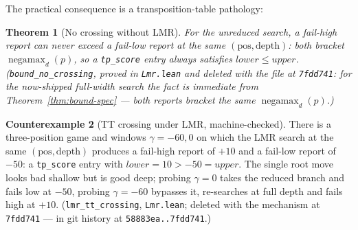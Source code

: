 \documentclass[11pt]{article}
\DeclareMathOperator{\negamax}{negamax}
\theoremstyle{plain}
\newtheorem{theorem}{Theorem}[section]
\theoremstyle{definition}
\newtheorem{counterexample}[theorem]{Counterexample}
\theoremstyle{remark}
\begin{document}
The practical consequence is a transposition-table pathology:

\begin{theorem}[No crossing without LMR]
\label{thm:no-crossing}
For the unreduced search, a fail-high report can never exceed a fail-low
report at the same $(\mathrm{pos}, \mathrm{depth})$: both bracket
$\negamax_d(p)$, so a \texttt{tp\_score} entry always satisfies
$\mathit{lower} \le \mathit{upper}$.
(\texttt{bound\_no\_crossing}, proved in \texttt{Lmr.lean} and deleted
with the file at \texttt{7fdd741}: for the now-shipped full-width
search the fact is immediate from Theorem~\ref{thm:bound-spec} ---
both reports bracket the same $\negamax_d(p)$.)
\end{theorem}

\begin{counterexample}[TT crossing under LMR, machine-checked]
\label{cex:crossing}
There is a three-position game and windows $\gamma = -60, 0$ on which
the LMR search at the same $(\mathrm{pos}, \mathrm{depth})$ produces a
fail-high report of $+10$ and a fail-low report of $-50$: a
\texttt{tp\_score} entry with $\mathit{lower} = 10 > -50 =
\mathit{upper}$.  The single root move looks bad shallow but is good
deep; probing $\gamma = 0$ takes the reduced branch and fails low at
$-50$, probing $\gamma = -60$ bypasses it, re-searches at full depth and
fails high at $+10$.
(\texttt{lmr\_tt\_crossing}, \texttt{Lmr.lean}; deleted with the
mechanism at \texttt{7fdd741} --- in git history at
\texttt{58883ea..7fdd741}.)
\end{counterexample}
\end{document}
